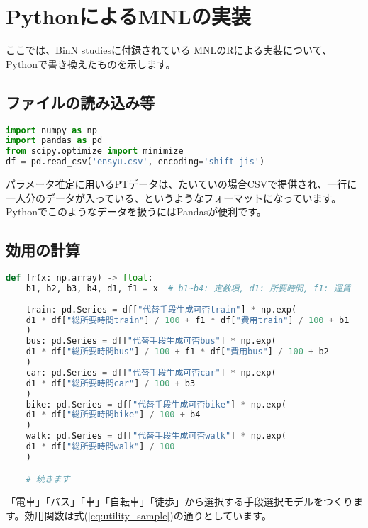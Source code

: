 \chapter{PythonによるMNLの実装}\label{code}

ここでは、BinN studies\cite{Hato2014}に付録されている MNLのRによる実装について、Pythonで書き換えたものを示します。

\section{ファイルの読み込み等}

\begin{lstlisting}[caption=ファイル読み込み,language=Python]
import numpy as np
import pandas as pd
from scipy.optimize import minimize
df = pd.read_csv('ensyu.csv', encoding='shift-jis')
\end{lstlisting}

パラメータ推定に用いるPTデータは、たいていの場合CSVで提供され、一行に一人分のデータが入っている、というようなフォーマットになっています。Pythonでこのようなデータを扱うにはPandasが便利です。

\section{効用の計算}

\begin{lstlisting}[caption=効用関数の設定,language=Python]
def fr(x: np.array) -> float:
    b1, b2, b3, b4, d1, f1 = x  # b1~b4: 定数項, d1: 所要時間, f1: 運賃
    
    train: pd.Series = df["代替手段生成可否train"] * np.exp(
    d1 * df["総所要時間train"] / 100 + f1 * df["費用train"] / 100 + b1
    )
    bus: pd.Series = df["代替手段生成可否bus"] * np.exp(
    d1 * df["総所要時間bus"] / 100 + f1 * df["費用bus"] / 100 + b2
    )
    car: pd.Series = df["代替手段生成可否car"] * np.exp(
    d1 * df["総所要時間car"] / 100 + b3
    )
    bike: pd.Series = df["代替手段生成可否bike"] * np.exp(
    d1 * df["総所要時間bike"] / 100 + b4
    )
    walk: pd.Series = df["代替手段生成可否walk"] * np.exp(
    d1 * df["総所要時間walk"] / 100
    )

    # 続きます
\end{lstlisting}

「電車」「バス」「車」「自転車」「徒歩」から選択する手段選択モデルをつくります。効用関数は式(\ref{eq:utility_sample})の通りとしています。

